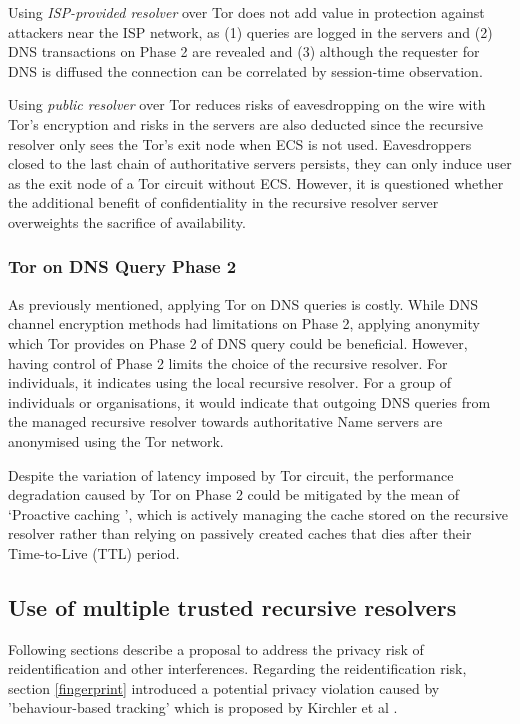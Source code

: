 Using \textit{ISP-provided resolver} over Tor does not add value in protection against attackers near the ISP network, as (1) queries are logged in the servers and (2) DNS transactions on Phase 2 are revealed and (3) although the requester for DNS is diffused the connection can be correlated by session-time observation.

Using \textit{public resolver} over Tor reduces risks of eavesdropping on the wire with Tor's encryption and risks in the servers are also deducted since the recursive resolver only sees the Tor's exit node when ECS is not used.
Eavesdroppers closed to the last chain of authoritative servers persists, they can only induce user as the exit node of a Tor circuit without ECS.
However, it is questioned whether the additional benefit of confidentiality in the recursive resolver server overweights the sacrifice of availability.

\subsubsection{Tor on DNS Query Phase 2}
As previously mentioned, applying Tor on DNS queries is costly.
While DNS channel encryption methods had limitations on Phase 2, applying anonymity which Tor provides on Phase 2 of DNS query could be beneficial.
However, having control of Phase 2 limits the choice of the recursive resolver.
For individuals, it indicates using the local recursive resolver.
For a group of individuals or organisations, it would indicate that outgoing DNS queries from the managed recursive resolver towards authoritative Name servers are anonymised using the Tor network.

Despite the variation of latency imposed by Tor circuit, the performance degradation caused by Tor on Phase 2 could be mitigated by the mean of `Proactive caching \cite{cohen2003proactive}', which is actively managing the cache stored on the recursive resolver rather than relying on passively created caches that dies after their Time-to-Live (TTL) period.

\subsection{Use of multiple trusted recursive resolvers}
Following sections describe a proposal to address the privacy risk of reidentification and other interferences.
Regarding the reidentification risk, section \ref{fingerprint} introduced a potential privacy violation caused by 'behaviour-based tracking' which is proposed by Kirchler et al \cite{kirchler2016tracked}.

